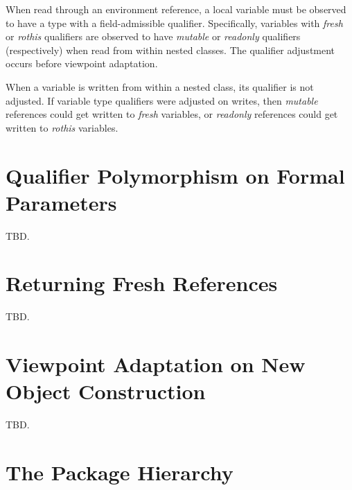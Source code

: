 When read through an environment reference, a local variable must be observed to
have a type with a field-admissible qualifier.
Specifically, variables with {\em fresh} or {\em rothis} qualifiers are observed
to have {\em mutable} or {\em readonly} qualifiers (respectively) when read from within nested classes.
The qualifier adjustment occurs before viewpoint adaptation.




When a variable is written from within a nested class, its qualifier is not adjusted.
If variable type qualifiers were adjusted on writes, then {\em mutable} references could
get written to {\em fresh} variables, or {\em readonly} references could get written to
{\em rothis} variables.

\section{Qualifier Polymorphism on Formal Parameters}
\label{sec-poly-qual-param}

TBD.

\section{Returning Fresh References} \label{sec-fresh}

TBD.

\section{Viewpoint Adaptation on New Object Construction} \label{sec-vp-new}

TBD.

\section{The Package Hierarchy} \label{sec-packages}

